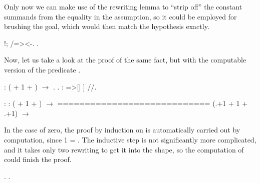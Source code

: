 \coqdocemptyline


Only now we can make use of the rewriting lemma to ``strip off'' the
constant summands from the equality in the assumption, so it could be
employed for brushing the goal, which would then match the hypothesis
exactly.


\begin{coqdoccode}
\coqdocemptyline
\coqdocnoindent
{}  !; /=><-.\coqdoceol
\coqdocnoindent
{}.\coqdoceol
\coqdocemptyline
\end{coqdoccode}


Now, let us take a look at the proof of the same fact, but with the
computable version of the predicate .


\begin{coqdoccode}
\coqdocemptyline
\coqdocnoindent
{}  :  ( + 1 + ) \ensuremath{\rightarrow} .\coqdoceol
\coqdocnoindent
{}.\coqdoceol
\coqdocnoindent
{}: =>[| ] //.\coqdoceol
\coqdocemptyline
\end{coqdoccode}


\coqdoceol
\coqdocemptyline
\coqdocindent{1.00em}
 : \coqdoceol
\coqdocindent{1.00em}
 :  ( + 1 + ) \ensuremath{\rightarrow} \coqdoceol
\coqdocindent{1.00em}
============================\coqdoceol
\coqdocindent{1.50em}
 (.+1 + 1 + .+1) \ensuremath{\rightarrow} 

\coqdocemptyline


In the case of zero, the proof by induction on  is automatically
carried out by computation, since  1 = . The inductive
step is not significantly more complicated, and it takes only two
rewriting to get it into the shape, so the computation of 
could finish the proof.


\begin{coqdoccode}
\coqdocemptyline
\coqdocnoindent
{}   .\coqdoceol
\coqdocnoindent
{}.\coqdoceol
\coqdocemptyline
\end{coqdoccode}


